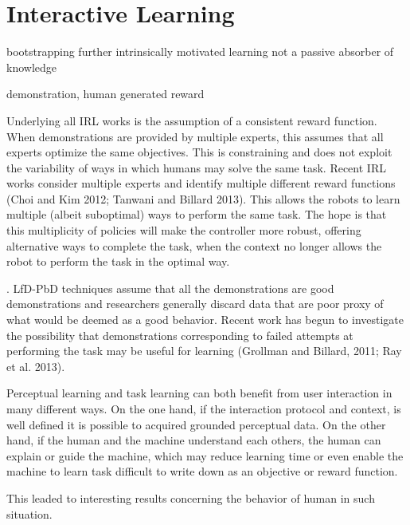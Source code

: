 \section{Interactive Learning}

bootstrapping further intrinsically motivated learning \cite{nguyen2011bootstrapping}
not a passive absorber of knowledge

demonstration, human generated reward

Underlying all IRL works is the assumption of a consistent reward function. When demonstrations are provided by multiple experts, this assumes that all experts optimize the same objectives. This is constraining and does not exploit the variability of ways in which humans may solve the same task. Recent IRL works consider multiple experts and identify multiple different reward functions (Choi and Kim 2012; Tanwani and Billard 2013). This allows the robots to learn multiple (albeit suboptimal) ways to perform the same task. The hope is that this multiplicity of policies will make the controller more robust, offering alternative ways to complete the task, when the context no longer allows the robot to perform the task in the optimal way. 

. LfD-PbD techniques assume that all the demonstrations are good demonstrations and researchers generally discard data that are poor proxy of what would be deemed as a good behavior. Recent work has begun to investigate the possibility that demonstrations corresponding to failed attempts at performing the task may be useful for learning (Grollman and Billard, 2011; Ray et al. 2013).

Perceptual learning and task learning can both benefit from user interaction in many different ways. On the one hand, if the interaction protocol and context, is well defined it is possible to acquired grounded perceptual data. On the other hand, if the human and the machine understand each others, the human can explain or guide the machine, which may reduce learning time or even enable the machine to learn task difficult to write down as an objective or reward function.

This leaded to interesting results concerning the behavior of human in such situation.

